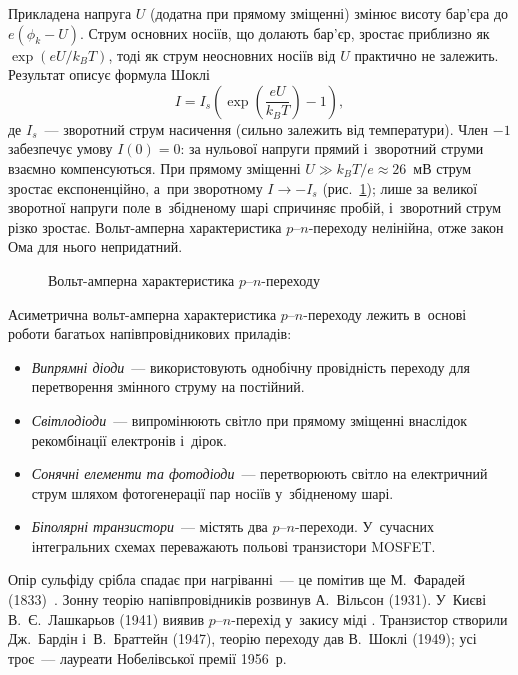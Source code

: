 Прикладена напруга $U$ (додатна при прямому зміщенні) змінює висоту бар'єра до
$e(\phi_k-U)$. Струм основних носіїв, що долають бар'єр, зростає приблизно як $\exp(eU/k_BT)$, тоді як
струм неосновних носіїв від $U$ практично не залежить. Результат описує формула Шоклі
\begin{equation}\label{eq:Shockley}
	I=I_s\left(\exp\!\left(\frac{eU}{k_BT}\right)-1\right),
\end{equation}
де $I_s$~--- зворотний струм насичення (сильно залежить від температури).
Член $-1$ забезпечує умову $I(0)=0$: за нульової напруги прямий і~зворотний струми
взаємно компенсуються.
При прямому зміщенні $U\gg k_BT/e\approx26$~мВ струм зростає експоненційно, а~при
зворотному $I\to-I_s$ (рис.~\ref{pic:PNIV}); лише за великої зворотної напруги поле
в~збідненому шарі спричиняє пробій, і~зворотний струм різко зростає. Вольт-амперна характеристика
$p$--$n$-переходу нелінійна, отже закон Ома для нього непридатний.

\begin{figure}[h!]\centering
	\caption{Вольт-амперна характеристика $p$--$n$-переходу\label{pic:PNIV}}
\end{figure}

Асиметрична вольт-амперна характеристика $p$--$n$-переходу лежить в~основі роботи багатьох
напівпровідникових приладів:
\begin{itemize}
	\item \emph{Випрямні діоди}~--- використовують однобічну провідність переходу для
	  перетворення змінного струму на постійний.
	\item \emph{Світлодіоди}~--- випромінюють світло при прямому зміщенні внаслідок
	  рекомбінації електронів і~дірок.
	\item \emph{Сонячні елементи та фотодіоди}~--- перетворюють світло на електричний
	  струм шляхом фотогенерації пар носіїв у~збідненому шарі.
	\item \emph{Біполярні транзистори}~--- містять два $p$--$n$-переходи. У~сучасних
	  інтегральних схемах переважають польові транзистори MOSFET.
\end{itemize}

\begin{Historical}
	Опір сульфіду срібла  спадає при нагріванні~--- це помітив ще М.~Фарадей
	(1833)~\cite{Faraday1833}. Зонну теорію напівпровідників розвинув А.~Вільсон (1931). У~Києві
	В.~Є.~Лашкарьов (1941) виявив $p$--$n$-перехід у~закису міді . Транзистор
	створили Дж.~Бардін і~В.~Браттейн (1947), теорію переходу дав В.~Шоклі (1949); усі
	троє~--- лауреати Нобелівської премії 1956~р.~\cite{Nobel1956}
\end{Historical}


